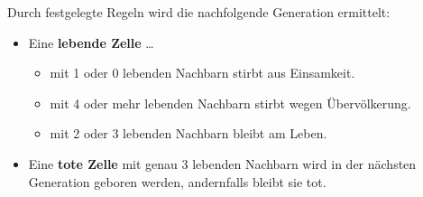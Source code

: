 Durch festgelegte Regeln wird die nachfolgende Generation ermittelt:
\begin{itemize}
	\item Eine \textbf{lebende Zelle} \dots
	\begin{itemize}
		\item mit 1 oder 0 lebenden Nachbarn stirbt aus Einsamkeit.
		\item mit 4 oder mehr lebenden Nachbarn stirbt wegen Übervölkerung.
		\item mit 2 oder 3 lebenden Nachbarn bleibt am Leben.
	\end{itemize}
	\item Eine \textbf{tote Zelle} mit genau 3 lebenden Nachbarn wird in der nächsten Generation geboren werden, andernfalls bleibt sie tot.
\end{itemize}

